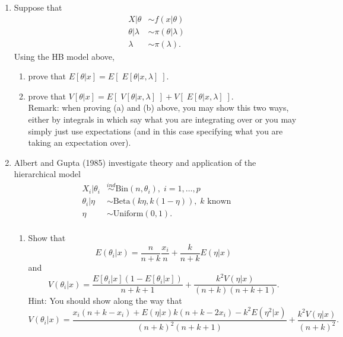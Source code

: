 \documentclass[11pt]{article}
\begin{document}
\begin{enumerate}
\item Suppose that 
\begin{align*}
X|\theta &\sim f(x|\theta) \\
\theta|\lambda &\sim \pi(\theta|\lambda) \\
\lambda &\sim \pi(\lambda).
\end{align*}
Using the HB model above, 
\begin{enumerate}
\item prove that $E[\theta|x] = E[\;E[\theta|x,\lambda]\;] .$
\item prove that $V[\theta|x] = E[\;V[\theta|x,\lambda]\;]  + V[\;E[\theta|x,\lambda]\;] .$\\

Remark: when proving (a) and (b) above, you may show this two ways, either by integrals in which say what you are integrating over or you may simply just use expectations (and in this case specifying what you are taking an expectation over). 
\end{enumerate}




\item Albert and Gupta (1985) investigate theory and application of the hierarchical model 
\begin{align*}
X_i| \theta_i &\stackrel{ind}{\sim} \text{Bin}(n, \theta_i),\; i=1,\ldots,p\\
\theta_i|\eta &\sim \text{Beta}(k\eta,k(1-\eta)),\;k \text{ known}\\
\eta &\sim \text{Uniform}(0,1).\\
\end{align*}


\begin{enumerate}
\item Show that 
$$E(\theta_i|x) = \dfrac{n}{n +k}\dfrac{x_i}{n} + \dfrac{k}{n +k}E(\eta|x)$$ and 
\
$$V(\theta_i|x) =\frac{E[\theta_i|x](1-E[\theta_i|x])}{ n + k + 1}
+ \frac{k^2V(\eta|x)}{(n+k)(n+k+1)}.$$
Hint: You should show along the way that $$V(\theta_i|x) = \frac{x_i(n+k - x_i) + E(\eta|x)k(n+k - 2 x_i) - k^2E(\eta^2|x)}{(n+k)^2(n+k+1)}
+ \frac{k^2V(\eta|x)}{(n+k)^2}.
$$


\end{enumerate}
\end{enumerate}
\end{document}
